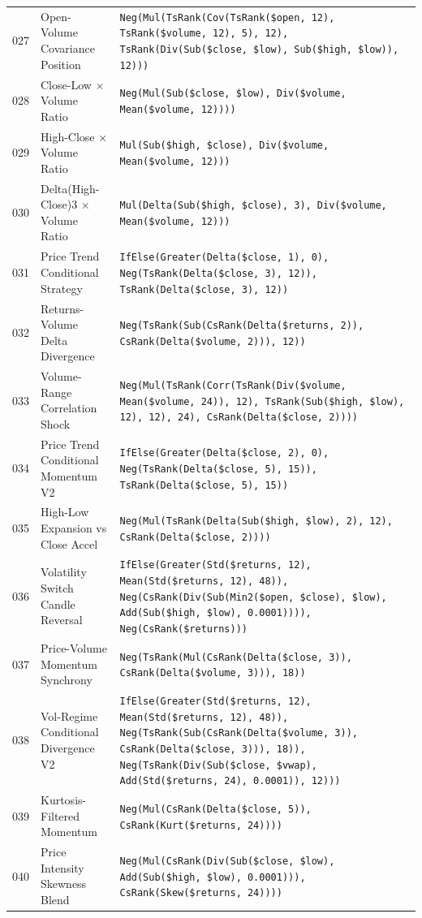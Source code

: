 \begin{longtable}{@{}llp{}@{}}
027 & Open-Volume Covariance Position & \texttt{Neg(Mul(TsRank(Cov(TsRank(\$open, 12), TsRank(\$volume, 12), 5), 12), TsRank(Div(Sub(\$close, \$low), Sub(\$high, \$low)), 12)))} \\
028 & Close-Low × Volume Ratio & \texttt{Neg(Mul(Sub(\$close, \$low), Div(\$volume, Mean(\$volume, 12))))} \\
029 & High-Close × Volume Ratio & \texttt{Mul(Sub(\$high, \$close), Div(\$volume, Mean(\$volume, 12)))} \\
030 & Delta(High-Close)3 × Volume Ratio & \texttt{Mul(Delta(Sub(\$high, \$close), 3), Div(\$volume, Mean(\$volume, 12)))} \\
031 & Price Trend Conditional Strategy & \texttt{IfElse(Greater(Delta(\$close, 1), 0), Neg(TsRank(Delta(\$close, 3), 12)), TsRank(Delta(\$close, 3), 12))} \\
032 & Returns-Volume Delta Divergence & \texttt{Neg(TsRank(Sub(CsRank(Delta(\$returns, 2)), CsRank(Delta(\$volume, 2))), 12))} \\
033 & Volume-Range Correlation Shock & \texttt{Neg(Mul(TsRank(Corr(TsRank(Div(\$volume, Mean(\$volume, 24)), 12), TsRank(Sub(\$high, \$low), 12), 12), 24), CsRank(Delta(\$close, 2))))} \\
034 & Price Trend Conditional Momentum V2 & \texttt{IfElse(Greater(Delta(\$close, 2), 0), Neg(TsRank(Delta(\$close, 5), 15)), TsRank(Delta(\$close, 5), 15))} \\
035 & High-Low Expansion vs Close Accel & \texttt{Neg(Mul(TsRank(Delta(Sub(\$high, \$low), 2), 12), CsRank(Delta(\$close, 2))))} \\
036 & Volatility Switch Candle Reversal & \texttt{IfElse(Greater(Std(\$returns, 12), Mean(Std(\$returns, 12), 48)), Neg(CsRank(Div(Sub(Min2(\$open, \$close), \$low), Add(Sub(\$high, \$low), 0.0001)))), Neg(CsRank(\$returns)))} \\
037 & Price-Volume Momentum Synchrony & \texttt{Neg(TsRank(Mul(CsRank(Delta(\$close, 3)), CsRank(Delta(\$volume, 3))), 18))} \\
038 & Vol-Regime Conditional Divergence V2 & \texttt{IfElse(Greater(Std(\$returns, 12), Mean(Std(\$returns, 12), 48)), Neg(TsRank(Sub(CsRank(Delta(\$volume, 3)), CsRank(Delta(\$close, 3))), 18)), Neg(TsRank(Div(Sub(\$close, \$vwap), Add(Std(\$returns, 24), 0.0001)), 12)))} \\
039 & Kurtosis-Filtered Momentum & \texttt{Neg(Mul(CsRank(Delta(\$close, 5)), CsRank(Kurt(\$returns, 24))))} \\
040 & Price Intensity Skewness Blend & \texttt{Neg(Mul(CsRank(Div(Sub(\$close, \$low), Add(Sub(\$high, \$low), 0.0001))), CsRank(Skew(\$returns, 24))))} \\

\end{longtable}
